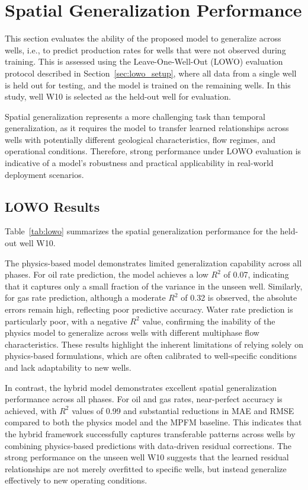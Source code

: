\documentclass[12pt,APA]{uomthesis}
\begin{document}
\section{Spatial Generalization Performance}
This section evaluates the ability of the proposed model to generalize across wells, i.e., to predict production rates for wells that were not observed during training. This is assessed using the Leave-One-Well-Out (LOWO) evaluation protocol described in Section~\ref{sec:lowo_setup}, where all data from a single well is held out for testing, and the model is trained on the remaining wells. In this study, well W10 is selected as the held-out well for evaluation.

Spatial generalization represents a more challenging task than temporal generalization, as it requires the model to transfer learned relationships across wells with potentially different geological characteristics, flow regimes, and operational conditions. Therefore, strong performance under LOWO evaluation is indicative of a model's robustness and practical applicability in real-world deployment scenarios.

\subsection{LOWO Results}
Table~\ref{tab:lowo} summarizes the spatial generalization performance for the held-out well W10.

The physics-based model demonstrates limited generalization capability across all phases. For oil rate prediction, the model achieves a low $R^2$ of 0.07, indicating that it captures only a small fraction of the variance in the unseen well. Similarly, for gas rate prediction, although a moderate $R^2$ of 0.32 is observed, the absolute errors remain high, reflecting poor predictive accuracy. Water rate prediction is particularly poor, with a negative $R^2$ value, confirming the inability of the physics model to generalize across wells with different multiphase flow characteristics. These results highlight the inherent limitations of relying solely on physics-based formulations, which are often calibrated to well-specific conditions and lack adaptability to new wells.

In contrast, the hybrid model demonstrates excellent spatial generalization performance across all phases. For oil and gas rates, near-perfect accuracy is achieved, with $R^2$ values of 0.99 and substantial reductions in MAE and RMSE compared to both the physics model and the MPFM baseline. This indicates that the hybrid framework successfully captures transferable patterns across wells by combining physics-based predictions with data-driven residual corrections. The strong performance on the unseen well W10 suggests that the learned residual relationships are not merely overfitted to specific wells, but instead generalize effectively to new operating conditions.
\end{document}
